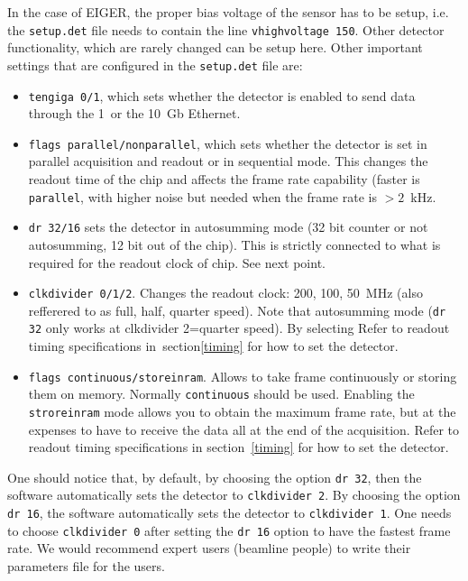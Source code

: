 \documentclass{article}
\newcommand{\E}{EIGER\xspace}
\begin{document}
In the case of \E, the proper bias voltage of the sensor has to be setup, i.e. the {\tt{setup.det}} file needs to contain the line {\tt{vhighvoltage 150}}. Other detector functionality, which are rarely changed can be setup here. 
Other important settings that are configured in the {\tt{setup.det}} file are:
\begin{itemize}
\item {\tt{tengiga 0/1}}, which sets whether the detector is enabled to send data through the 1~or the 10~Gb Ethernet.
\item {\tt{flags parallel/nonparallel}}, which sets whether the detector is set in parallel acquisition and readout or in sequential mode. This changes the readout time of the chip and affects the frame rate capability (faster is {\tt{parallel}}, with higher noise but needed when the frame rate is $>2$~kHz. 
\item {\tt{dr 32/16}} sets the detector in autosumming mode (32 bit counter or not autosumming, 12 bit out of the chip). This is strictly connected to what is required for the readout clock of chip. See next point.
\item {\tt{clkdivider 0/1/2}}. Changes the readout clock: 200, 100, 50~MHz (also refferered to as full, half, quarter speed). Note that autosumming mode ({\tt{dr 32}} only works at {clkdivider 2}=quarter speed). By selecting Refer to readout timing specifications in~section\ref{timing} for how to set the detector. 
\item {\tt{flags continuous/storeinram}}. Allows to take frame continuously or storing them on memory. Normally {\tt{continuous}} should be used. Enabling the  {\tt{stroreinram}} mode allows you to obtain the maximum frame rate, but at the expenses to have to receive the data all at the end of the acquisition. Refer to readout timing specifications in section~\ref{timing} for how to set the detector.
\end{itemize}

One should notice that, by default, by choosing the option {\tt{dr 32}}, then the software automatically sets the detector to  {\tt{clkdivider 2}}. By choosing the option {\tt{dr 16}}, the software automatically sets the detector to  {\tt{clkdivider 1}}. One needs to choose {\tt{clkdivider 0}} after setting the {\tt{dr 16}} option to have the fastest frame rate. 
We would recommend expert users (beamline people) to write their parameters file for the users. 
\end{document}
